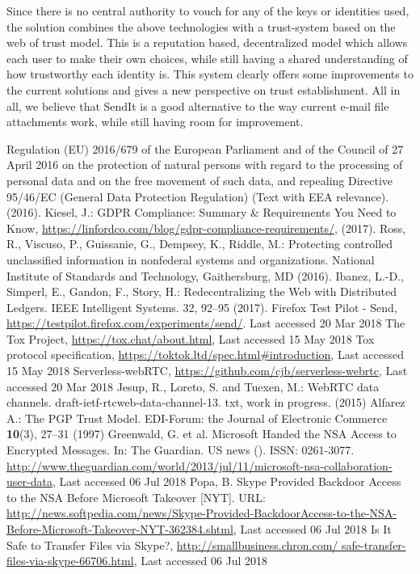 \documentclass[letterpaper, 10 pt, conference]{ieeeconf}  %
\begin{document}
Since there is no central authority to vouch for any of the keys or identities used, the solution combines the above technologies with a trust-system based on the web of trust model. This is a reputation based, decentralized model which allows each user to make their own choices, while still having a shared understanding of how trustworthy each identity is. This system clearly offers some improvements to the current solutions and gives a new perspective on trust establishment. All in all, we believe that SendIt is a good alternative to the way current e-mail file attachments work, while still having room for improvement.
%
\begin{thebibliography}{99}
Regulation (EU) 2016/679 of the European Parliament and of the Council of 27 April 2016 on the protection of natural persons with regard to the processing of personal data and on the free movement of such data, and repealing Directive 95/46/EC (General Data Protection Regulation) (Text with EEA relevance). (2016).
Kiesel, J.: GDPR Compliance: Summary \& Requirements You Need to Know, \url{https://linfordco.com/blog/gdpr-compliance-requirements/}, (2017).
Ross, R., Viscuso, P., Guissanie, G., Dempsey, K., Riddle, M.: Protecting controlled unclassified information in nonfederal systems and organizations. National Institute of Standards and Technology, Gaithersburg, MD (2016).
Ibanez, L.-D., Simperl, E., Gandon, F., Story, H.: Redecentralizing the Web with Distributed Ledgers. IEEE Intelligent Systems. 32, 92–95 (2017).
Firefox Test Pilot - Send, \url{https://testpilot.firefox.com/experiments/send/}. Last accessed 20 Mar 2018
The Tox Project, \url{https://tox.chat/about.html}, Last accessed 15 May 2018
Tox protocol specification, \url{https://toktok.ltd/spec.html#introduction}, Last accessed 15 May 2018
Serverless-webRTC, \url{https://github.com/cjb/serverless-webrtc}, Last accessed 20 Mar 2018
Jesup, R., Loreto, S. and Tuexen, M.: WebRTC data channels. draft-ietf-rtcweb-data-channel-13. txt, work in progress. (2015)
Alfarez A.: The PGP Trust Model. EDI-Forum: the Journal of Electronic Commerce \textbf{10}(3), 27--31 (1997)
Greenwald, G. et al. Microsoft Handed the NSA Access to Encrypted Messages.
In: The Guardian. US news (). ISSN: 0261-3077. \url{http://www.theguardian.com/world/2013/jul/11/microsoft-nsa-collaboration-user-data}, Last accessed 06 Jul 2018
Popa, B. Skype Provided Backdoor Access to the NSA Before Microsoft Takeover
[NYT]. URL: \url{http://news.softpedia.com/news/Skype-Provided-BackdoorAccess-to-the-NSA-Before-Microsoft-Takeover-NYT-362384.shtml}, Last accessed 06 Jul 2018
Is It Safe to Transfer Files via Skype?, \url{http://smallbusiness.chron.com/
safe-transfer-files-via-skype-66706.html}, Last accessed 06 Jul 2018

%
\end{thebibliography}
\end{document}
